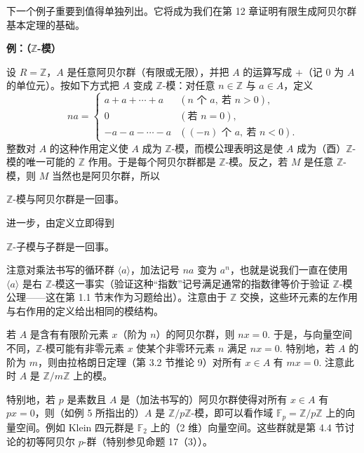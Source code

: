 下一个例子重要到值得单独列出。它将成为我们在第 12 章证明有限生成阿贝尔群基本定理的基础。

\noindent\textbf{例：（\(\mathbb{Z}\)-模）}

设 \(R = \mathbb{Z}\)，\(A\) 是任意阿贝尔群（有限或无限），并把 \(A\) 的运算写成 \(+\)（记 \(0\) 为 \(A\) 的单位元）。按如下方式把 \(A\) 变成 \(\mathbb{Z}\)-模：对任意 \(n \in \mathbb{Z}\) 与 \(a \in A\)，定义
\[
na = \begin{cases}
a+a+\cdots+a & (n \text{ 个 } a,\ \text{若 } n > 0), \\
0 & (\text{若 } n = 0), \\
-a-a-\cdots-a & ((-n) \text{ 个 } a,\ \text{若 } n < 0).
\end{cases}
\]
整数对 \(A\) 的这种作用定义使 \(A\) 成为 \(\mathbb{Z}\)-模，而模公理表明这是使 \(A\) 成为（酉）\(\mathbb{Z}\)-模的唯一可能的 \(\mathbb{Z}\) 作用。于是每个阿贝尔群都是 \(\mathbb{Z}\)-模。反之，若 \(M\) 是任意 \(\mathbb{Z}\)-模，则 \(M\) 当然也是阿贝尔群，所以

\begin{center}
\(\mathbb{Z}\)-模与阿贝尔群是一回事。
\end{center}

进一步，由定义立即得到

\begin{center}
\(\mathbb{Z}\)-子模与子群是一回事。
\end{center}

注意对乘法书写的循环群 \(\langle a \rangle\)，加法记号 \(na\) 变为 \(a^n\)，也就是说我们一直在使用 \(\langle a \rangle\) 是右 \(\mathbb{Z}\)-模这一事实（验证这种“指数”记号满足通常的指数律等价于验证 \(\mathbb{Z}\)-模公理——这在第 1.1 节末作为习题给出）。注意由于 \(\mathbb{Z}\) 交换，这些环元素的左作用与右作用的定义给出相同的模结构。

若 \(A\) 是含有有限阶元素 \(x\)（阶为 \(n\)）的阿贝尔群，则 \(nx = 0\). 于是，与向量空间不同，\(\mathbb{Z}\)-模可能有非零元素 \(x\) 使某个非零环元素 \(n\) 满足 \(nx = 0\). 特别地，若 \(A\) 的阶为 \(m\)，则由拉格朗日定理（第 3.2 节推论 9）对所有 \(x \in A\) 有 \(mx = 0\). 注意此时 \(A\) 是 \(\mathbb{Z}/m\mathbb{Z}\) 上的模。

特别地，若 \(p\) 是素数且 \(A\) 是（加法书写的）阿贝尔群使得对所有 \(x \in A\) 有 \(px = 0\)，则（如例 5 所指出的）\(A\) 是 \(\mathbb{Z}/p\mathbb{Z}\)-模，即可以看作域 \(\mathbb{F}_p = \mathbb{Z}/p\mathbb{Z}\) 上的向量空间。例如 Klein 四元群是 \(\mathbb{F}_2\) 上的（2 维）向量空间。这些群就是第 4.4 节讨论的初等阿贝尔 \(p\)-群（特别参见命题 17（3））。

